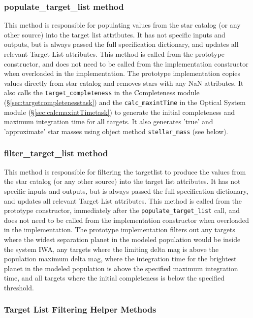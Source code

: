 \documentclass[cleanfoot]{asme2ej}
\begin{document}
\subsubsection{populate\_target\_list method} \label{sec:populatetargetlisttask}

This method is responsible for populating values from the star catalog  (or any other source) into the target list attributes. It has not specific inputs and outputs, but is always passed the full specification dictionary, and updates all relevant Target List attributes.  This method is called from the prototype constructor, and does not need to be called from the implementation constructor when overloaded in the implementation.   The prototype implementation copies values directly from star catalog and removes stars with any NaN attributes. It also calls the \verb+target_completeness+ in the Completeness module (\S\ref{sec:targetcompletenesstask}) and the \verb+calc_maxintTime+ in the Optical System module (\S\ref{sec:calcmaxintTimetask}) to generate the initial completeness and maximum integration time for all targets.  It also generates 'true' and 'approximate' star masses using object method \verb+stellar_mass+ (see below).

\subsubsection{filter\_target\_list method}  \label{sec:filtertargetlisttask}
This method is responsible for filtering the targetlist to produce the values from the star catalog  (or any other source) into the target list attributes. It has not specific inputs and outputs, but is always passed the full specification dictionary, and updates all relevant Target List attributes.  This method is called from the prototype constructor, immediately after the \verb+populate_target_list+ call, and does not need to be called from the implementation constructor when overloaded in the implementation.   The prototype implementation filters out any targets where the widest separation planet in the modeled population would be inside the system IWA, any targets where the limiting delta mag is above the population maximum delta mag, where the integration time for the brightest planet in the modeled population is above the specified maximum integration time, and all targets where the initial completeness is below the specified threshold. 

\subsubsection{Target List Filtering Helper Methods}
\end{document}
